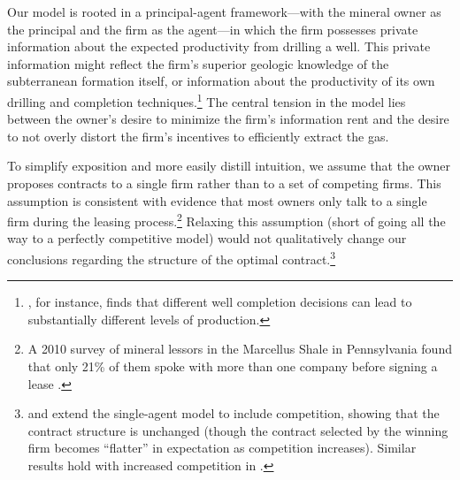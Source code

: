 \documentclass[12pt]{article}
\begin{document}
Our model is rooted in a principal-agent framework---with the mineral owner as the principal and the firm as the agent---in which the firm possesses private information about the expected productivity from drilling a well. This private information might reflect the firm's superior geologic knowledge of the subterranean formation itself, or information about the productivity of its own drilling and completion techniques.\footnote{\citet{bib:covert}, for instance, finds that different well completion decisions can lead to substantially different levels of production.} The central tension in the model lies between the owner's desire to minimize the firm's information rent and the desire to not overly distort the firm's incentives to efficiently extract the gas.

To simplify exposition and more easily distill intuition, we assume that the owner proposes contracts to a single firm rather than to a set of competing firms. This assumption is consistent with evidence that most owners only talk to a single firm during the leasing process.\footnote{A 2010 survey of mineral lessors in the Marcellus Shale in Pennsylvania found that only 21\% of them spoke with more than one company before signing a lease \citep{bib:pennst}.} Relaxing this assumption (short of going all the way to a perfectly competitive model) would not qualitatively change our conclusions regarding the structure of the optimal contract.\footnote{\citet{bib:laffonttirole1987} and \citet{bib:mcafee} extend the single-agent \citet{bib:laffonttirole1986} model to include competition, showing that the contract structure is unchanged (though the contract selected by the winning firm becomes ``flatter'' in expectation as competition increases). Similar results hold with increased competition in \citet{bib:board}.}
\end{document}
